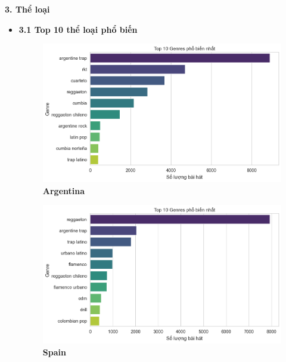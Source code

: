 \textbf{3. Thể loại}
\begin{itemize}
    \item \textbf{3.1 Top 10 thể loại phổ biến}


    \begin{figure}[H]
        \centering
        \begin{minipage}{0.35\textwidth}
            \centering
            \includegraphics[width=\linewidth]{../graphics/data_top50/figure/1/EDA_argentina.png}
            \\[4pt] {\small \textbf{Argentina}}
        \end{minipage}
        \hfill
        \begin{minipage}{0.35\textwidth}
            \centering
            \includegraphics[width=\linewidth]{../graphics/data_top50/figure/1/EDA_spain.png}
            \\[4pt] {\small \textbf{Spain}}
        \end{minipage}

        \vspace{0.4cm}


\end{figure}
\end{itemize}
